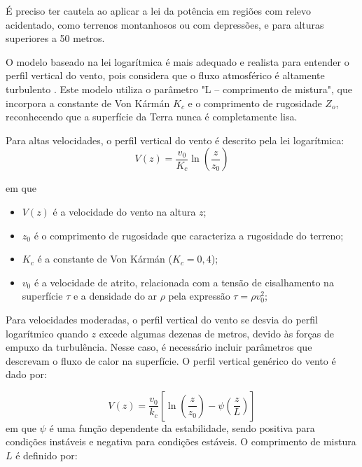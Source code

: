         \par É preciso ter cautela ao aplicar a lei da potência em regiões com relevo acidentado, como terrenos montanhosos ou com depressões, e para alturas superiores a 50 metros.

        \par O modelo baseado na lei logarítmica é mais adequado e realista para entender o perfil vertical do vento, pois considera que o fluxo atmosférico é altamente turbulento \cite{troen1989,silva1999,fadigas2011}. Este modelo utiliza o parâmetro "L – comprimento de mistura", que incorpora a constante de Von Kármán $K_c$ e o comprimento de rugosidade $Z_o$, reconhecendo que a superfície da Terra nunca é completamente lisa.

        \par Para altas velocidades, o perfil vertical do vento é descrito pela lei logarítmica:
        \begin{equation}
            V(z) = \frac{v_0}{K_c} \ln \left( \frac{z}{z_0} \right)
        \end{equation}

        em que
        \begin{itemize}
            \item $V(z)$ é a velocidade do vento na altura $z$;
            \item $z_0$ é o comprimento de rugosidade que caracteriza a rugosidade do terreno;
            \item $K_c$ é a constante de Von Kármán ($K_c = 0,4$);
            \item $v_0$ é a velocidade de atrito, relacionada com a tensão de cisalhamento na superfície $\tau$ e a densidade do ar $\rho$ pela expressão $\tau = \rho v_0^2$;
        \end{itemize}

        \par Para velocidades moderadas, o perfil vertical do vento se desvia do perfil logarítmico quando $z$ excede algumas dezenas de metros, devido às forças de empuxo da turbulência. Nesse caso, é necessário incluir parâmetros que descrevam o fluxo de calor na superfície. O perfil vertical genérico do vento é dado por:
        
        \begin{equation}
            V(z) = \frac{v_0}{k_c} \left[ \ln \left( \frac{z}{z_0} \right) - \psi \left( \frac{z}{L} \right) \right]
        \end{equation}
        em que $\psi$ é uma função dependente da estabilidade, sendo positiva para condições instáveis e negativa para condições estáveis. O comprimento de mistura $L$ é definido por:

